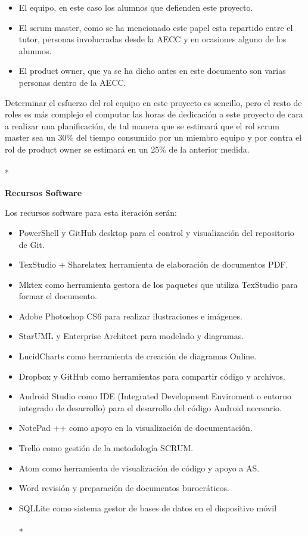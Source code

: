 \documentclass[../pfc.tex]{subfiles}
\begin{document}
	\begin{itemize} 
		\item El equipo, en este caso los alumnos que defienden este proyecto. 
		\item El scrum master, como se ha mencionado este papel esta repartido entre el tutor, personas involucradas desde la AECC y en ocasiones alguno de los alumnos. 
		\item El product owner, que ya se ha dicho antes en este documento son varias personas dentro de la AECC. 
	\end{itemize}
	
	Determinar el esfuerzo del rol equipo en este proyecto es sencillo, pero el resto de roles es más complejo el computar las horas de dedicación a este proyecto de cara a realizar una planificación, de tal manera que se estimará que el rol scrum master sea un 30\% del tiempo consumido por un miembro equipo y por contra el rol de product owner se estimará en un 25\% de la anterior medida.\\\\*
	
	\textbf{Recursos Software}
	
	Los recursos software para esta iteración serán:
	\begin{itemize}
		\item PowerShell y GitHub desktop para el control y visualización del repositorio de Git.
		\item TexStudio + Sharelatex herramienta de elaboración de documentos PDF.
		\item Mktex como herramienta gestora de los paquetes que utiliza TexStudio para formar el documento.
		\item Adobe Photoshop CS6 para realizar ilustraciones e imágenes.
		\item StarUML y Enterprise Architect para modelado y diagramas.
		\item LucidCharts como herramienta de creación de diagramas Online.
		\item Dropbox y GitHub como herramientas para compartir código y archivos.
		\item Android Studio como IDE (Integrated Development Enviroment o entorno integrado de desarrollo) para el desarrollo del código Android necesario.
		\item NotePad ++ como apoyo en la visualización de documentación.
		\item Trello como gestión de la metodología SCRUM.
		\item Atom como herramienta de visualización de código y apoyo a AS.
		\item Word revisión y preparación de documentos burocráticos.
		\item SQLLite como sistema gestor de bases de datos en el dispositivo móvil\\\\*
	\end{itemize}
	
\end{document}
